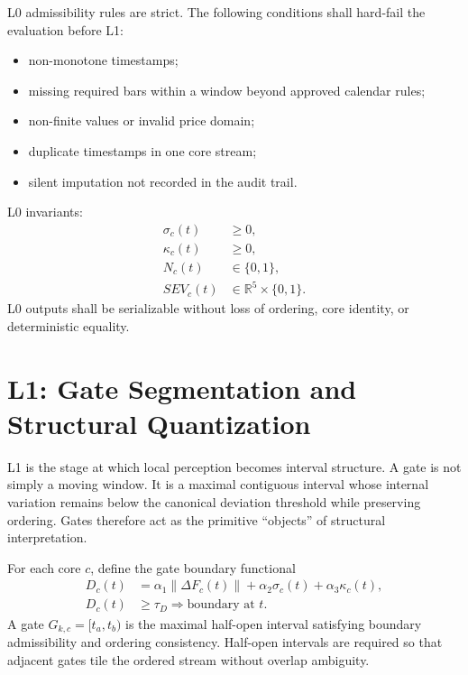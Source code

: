 L0 admissibility rules are strict. The following conditions shall hard-fail the evaluation before L1:
\begin{itemize}
    \item non-monotone timestamps;
    \item missing required bars within a window beyond approved calendar rules;
    \item non-finite values or invalid price domain;
    \item duplicate timestamps in one core stream;
    \item silent imputation not recorded in the audit trail.
\end{itemize}

L0 invariants:
\begin{align*}
\sigma_c(t) &\ge 0,\\
\kappa_c(t) &\ge 0,\\
N_c(t) &\in \{0,1\},\\
SEV_c(t) &\in \mathbb{R}^5\times\{0,1\}.
\end{align*}
L0 outputs shall be serializable without loss of ordering, core identity, or deterministic equality.

\section{L1: Gate Segmentation and Structural Quantization}

L1 is the stage at which local perception becomes interval structure. A gate is not simply a moving window. It is a maximal contiguous interval whose internal variation remains below the canonical deviation threshold while preserving ordering. Gates therefore act as the primitive ``objects'' of structural interpretation.

For each core $c$, define the gate boundary functional
\begin{align*}
D_c(t) &= \alpha_1\lVert\Delta F_c(t)\rVert + \alpha_2\sigma_c(t) + \alpha_3\kappa_c(t),\\
D_c(t) &\ge \tau_D \Rightarrow \text{boundary at } t.
\end{align*}
A gate $G_{k,c}=[t_a,t_b)$ is the maximal half-open interval satisfying boundary admissibility and ordering consistency. Half-open intervals are required so that adjacent gates tile the ordered stream without overlap ambiguity.


